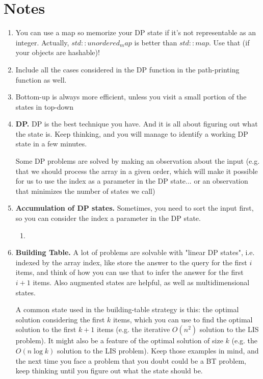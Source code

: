 \documentclass[12pt]{book}
\begin{document}
\section{Notes}
\begin{enumerate}[label = \roman*.]
\item You can use a map so memorize your DP state if it's not representable as an integer. Actually, $std::unordered_map$ is better than $std::map$. Use that (if your objects are hashable)!
\item Include all the cases considered in the DP function in the path-printing function as well.
\item Bottom-up is always more efficient, unless you visit a small portion of the states in top-down
\item \textbf{DP. }
DP is the best technique you have. And it is all about figuring out what the state is. Keep thinking, and you will manage to identify a working DP state in a few minutes.

Some DP problems are solved by making an observation about the input (e.g. that we should process the array in a given order, which will make it possible for us to use the index as a parameter in the DP state... or an observation that minimizes the number of states we call)
\item \textbf{Accumulation of DP states. }
Sometimes, you need to sort the input first, so you can consider the index a parameter in the DP state.
\begin{enumerate}
\item
\end{enumerate}
\item \textbf{Building Table. }
A lot of problems are solvable with "linear DP states", i.e. indexed by the array index, like store the answer to the query for the first $i$ items, and think of how you can use that to infer the answer for the first $i+1$ items. Also augmented states are helpful, as well as multidimensional states.

A common state used in the building-table strategy is this: the optimal solution considering the first $k$ items, which you can use to find the optimal solution to the first $k + 1$ items (e.g. the iterative $O(n^2)$ solution to the LIS problem). It might also be a feature of the optimal solution of size $k$ (e.g. the $O(n\log k)$ solution to the LIS problem). Keep those examples in mind, and the next time you face a problem that you doubt could be a BT problem, keep thinking until you figure out what the state should be.


\end{enumerate}
\end{document}

